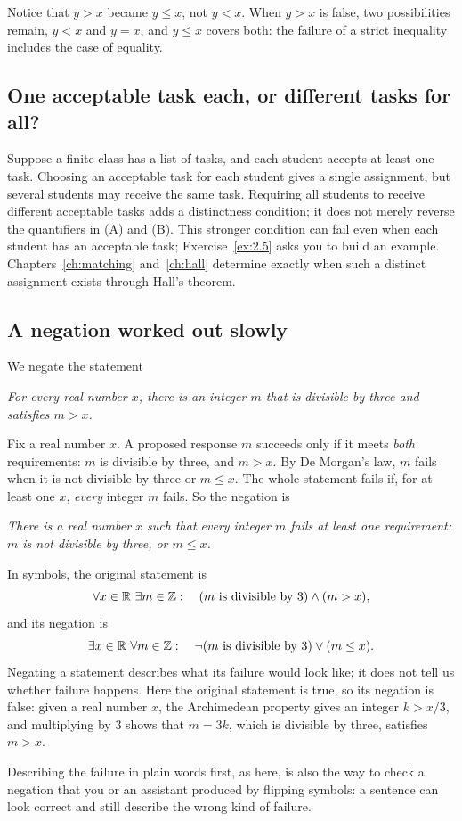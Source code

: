 Notice that $y>x$ became $y\le x$, not $y<x$. When $y>x$ is false, two possibilities remain, $y<x$ and $y=x$, and $y\le x$ covers both: the failure of a strict inequality includes the case of equality.


\subsection*{One acceptable task each, or different tasks for all?}
Suppose a finite class has a list of tasks, and each student accepts at least one task. Choosing an acceptable task for each student gives a single assignment, but several students may receive the same task. Requiring all students to receive different acceptable tasks adds a distinctness condition; it does not merely reverse the quantifiers in (A) and (B). This stronger condition can fail even when each student has an acceptable task; Exercise~\ref{ex:2.5} asks you to build an example. Chapters~\ref{ch:matching} and~\ref{ch:hall} determine exactly when such a distinct assignment exists through Hall's theorem.

\subsection*{A negation worked out slowly}
We negate the statement
\begin{center}
\emph{For every real number $x$, there is an integer $m$ that is divisible by three and satisfies $m>x$.}
\end{center}
Fix a real number $x$. A proposed response $m$ succeeds only if it meets \emph{both} requirements: $m$ is divisible by three, and $m>x$. By De Morgan's law, $m$ fails when it is not divisible by three or $m\le x$. The whole statement fails if, for at least one $x$, \emph{every} integer $m$ fails. So the negation is
\begin{center}
\emph{There is a real number $x$ such that every integer $m$ fails at least one requirement: $m$ is not divisible by three, or $m\le x$.}
\end{center}
In symbols, the original statement is
\[
\forall x\in\mathbb R\ \exists m\in\mathbb Z:\quad (m\text{ is divisible by }3)\land(m>x),
\]
and its negation is
\[
\exists x\in\mathbb R\ \forall m\in\mathbb Z:\quad \neg(m\text{ is divisible by }3)\lor(m\le x).
\]
Negating a statement describes what its failure would look like; it does not tell us whether failure happens. Here the original statement is true, so its negation is false: given a real number $x$, the Archimedean property gives an integer $k>x/3$, and multiplying by $3$ shows that $m=3k$, which is divisible by three, satisfies $m>x$.

Describing the failure in plain words first, as here, is also the way to check a negation that you or an assistant produced by flipping symbols: a sentence can look correct and still describe the wrong kind of failure.
